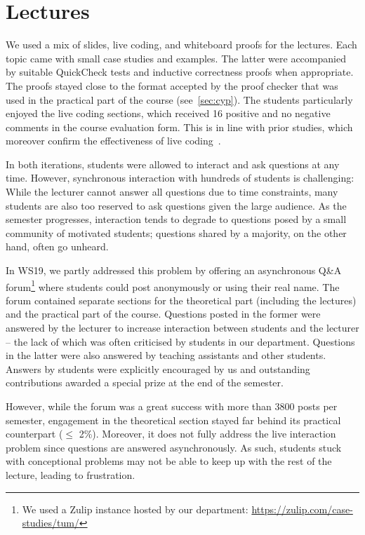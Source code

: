 \section{Lectures}\label{sec:lectures}

We used a mix of slides,
live coding, and whiteboard proofs for the lectures.
Each topic came with small case studies and examples.
The latter were accompanied by suitable QuickCheck tests
and inductive correctness proofs when appropriate.
The proofs stayed close to the format accepted by the proof checker that was used in the practical part of the course (see~\cref{sec:cyp}).
The students particularly enjoyed the live coding sections,
which received 16 positive and no negative comments in the course evaluation form.
This is in line with prior studies,
which moreover confirm the effectiveness of live coding~\cite{livecoding1,livecoding2}.

In both iterations, students were allowed to interact and ask questions at any time.
However, synchronous interaction with hundreds of students is challenging:
While the lecturer cannot answer all questions due to time constraints,
many students are also too reserved to ask questions given the large audience.
As the semester progresses, interaction tends to degrade to
questions posed by a small community of motivated students;
questions shared by a majority, on the other hand, often go unheard.

In WS19, we partly addressed this problem by offering an asynchronous Q\&A forum\footnote{We used a Zulip instance hosted by our department: \url{https://zulip.com/case-studies/tum/}}
where students could post anonymously or using their real name.
The forum contained separate sections for the theoretical part (including the lectures)
and the practical part of the course.
Questions posted in the former were answered by the lecturer
to increase interaction between students and the lecturer -- the lack of which was often criticised by students in our department.
Questions in the latter were also answered by teaching assistants and other students.
Answers by students were explicitly encouraged by us and
outstanding contributions awarded a special prize at the end of the semester.

However, while the forum was a great success with more than 3800 posts per semester,
engagement in the theoretical section stayed far behind its practical counterpart ($\leq$ 2\%).
Moreover, it does not fully address the live interaction problem since
questions are answered asynchronously.
As such, students stuck with conceptional problems may not be able
to keep up with the rest of the lecture,
leading to frustration.

